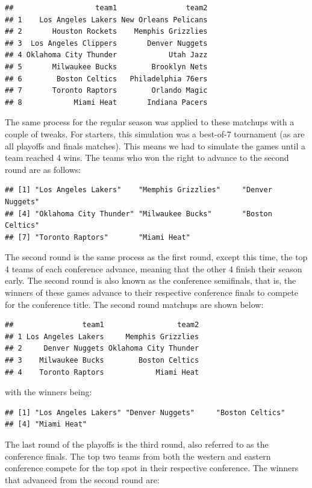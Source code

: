 \documentclass[]{article}
\begin{document}
\begin{verbatim}
##                   team1                team2
## 1    Los Angeles Lakers New Orleans Pelicans
## 2       Houston Rockets    Memphis Grizzlies
## 3  Los Angeles Clippers       Denver Nuggets
## 4 Oklahoma City Thunder            Utah Jazz
## 5       Milwaukee Bucks        Brooklyn Nets
## 6        Boston Celtics   Philadelphia 76ers
## 7       Toronto Raptors        Orlando Magic
## 8            Miami Heat       Indiana Pacers
\end{verbatim}

The same process for the regular season was applied to these matchups
with a couple of tweaks. For starters, this simulation was a best-of-7
tournament (as are all playoffs and finals matches). This means we had
to simulate the games until a team reached 4 wins. The teams who won the
right to advance to the second round are as follows:

\begin{verbatim}
## [1] "Los Angeles Lakers"    "Memphis Grizzlies"     "Denver Nuggets"       
## [4] "Oklahoma City Thunder" "Milwaukee Bucks"       "Boston Celtics"       
## [7] "Toronto Raptors"       "Miami Heat"
\end{verbatim}

The second round is the same process as the first round, except this
time, the top 4 teams of each conference advance, meaning that the other
4 finish their season early. The second round is also known as the
conference semifinals, that is, the winners of these games advance to
their respective conference finals to compete for the conference title.
The second round matchups are shown below:

\begin{verbatim}
##                team1                 team2
## 1 Los Angeles Lakers     Memphis Grizzlies
## 2     Denver Nuggets Oklahoma City Thunder
## 3    Milwaukee Bucks        Boston Celtics
## 4    Toronto Raptors            Miami Heat
\end{verbatim}

with the winners being:

\begin{verbatim}
## [1] "Los Angeles Lakers" "Denver Nuggets"     "Boston Celtics"    
## [4] "Miami Heat"
\end{verbatim}

The last round of the playoffs is the third round, also referred to as
the conference finals. The top two teams from both the western and
eastern conference compete for the top spot in their respective
conference. The winners that advanced from the second round are:
\end{document}
